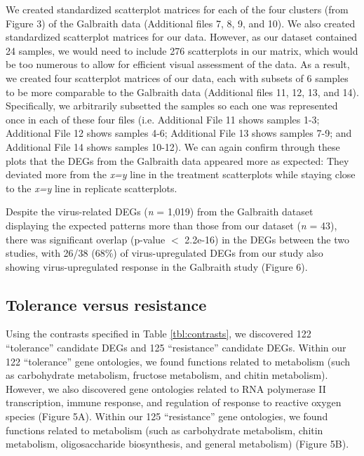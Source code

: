 \documentclass{bmcart}
\begin{document}
\begin{linenumbers}
\begin{doublespacing}
We created standardized scatterplot matrices for each of the four clusters (from Figure 3) of the Galbraith data (Additional files 7, 8, 9, and 10). We also created standardized scatterplot matrices for our data. However, as our dataset contained 24 samples, we would need to include 276 scatterplots in our matrix, which would be too numerous to allow for efficient visual assessment of the data. As a result, we created four scatterplot matrices of our data, each with subsets of 6 samples to be more comparable to the Galbraith data (Additional files 11, 12, 13, and 14). Specifically, we arbitrarily subsetted the samples so each one was represented once in each of these four files (i.e. Additional File 11 shows samples 1-3; Additional File 12 shows samples 4-6; Additional File 13 shows samples 7-9; and Additional File 14 shows samples 10-12). We can again confirm through these plots that the DEGs from the Galbraith data appeared more as expected: They deviated more from the \textit{x=y} line in the treatment scatterplots while staying close to the \textit{x=y} line in replicate scatterplots.

Despite the virus-related DEGs (\textit{n} = 1,019) from the Galbraith dataset displaying the expected patterns more than those from our dataset (\textit{n} = 43), there was significant overlap (p-value $<$ 2.2e-16) in the DEGs between the two studies, with 26/38 (68\%) of virus-upregulated DEGs from our study also showing virus-upregulated response in the Galbraith study (Figure 6).

\subsection*{Tolerance versus resistance}

Using the contrasts specified in Table \ref{tbl:contrasts}, we discovered 122 ``tolerance'' candidate DEGs and 125 ``resistance'' candidate DEGs. Within our 122 ``tolerance'' gene ontologies, we found functions related to metabolism (such as carbohydrate metabolism, fructose metabolism, and chitin metabolism). However, we also discovered gene ontologies related to RNA polymerase II transcription, immune response, and regulation of response to reactive oxygen species (Figure 5A). Within our 125 ``resistance'' gene ontologies, we found functions related to metabolism (such as carbohydrate metabolism, chitin metabolism, oligosaccharide biosynthesis, and general metabolism) (Figure 5B).


\end{doublespacing}
\end{linenumbers}
\end{document}

